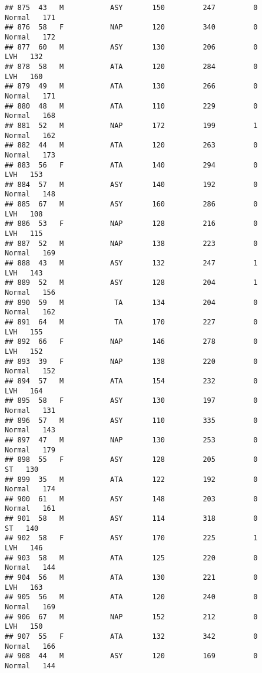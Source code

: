 \documentclass[
]{article}
\begin{document}
\begin{verbatim}
## 875  43   M           ASY       150         247         0     Normal   171
## 876  58   F           NAP       120         340         0     Normal   172
## 877  60   M           ASY       130         206         0        LVH   132
## 878  58   M           ATA       120         284         0        LVH   160
## 879  49   M           ATA       130         266         0     Normal   171
## 880  48   M           ATA       110         229         0     Normal   168
## 881  52   M           NAP       172         199         1     Normal   162
## 882  44   M           ATA       120         263         0     Normal   173
## 883  56   F           ATA       140         294         0        LVH   153
## 884  57   M           ASY       140         192         0     Normal   148
## 885  67   M           ASY       160         286         0        LVH   108
## 886  53   F           NAP       128         216         0        LVH   115
## 887  52   M           NAP       138         223         0     Normal   169
## 888  43   M           ASY       132         247         1        LVH   143
## 889  52   M           ASY       128         204         1     Normal   156
## 890  59   M            TA       134         204         0     Normal   162
## 891  64   M            TA       170         227         0        LVH   155
## 892  66   F           NAP       146         278         0        LVH   152
## 893  39   F           NAP       138         220         0     Normal   152
## 894  57   M           ATA       154         232         0        LVH   164
## 895  58   F           ASY       130         197         0     Normal   131
## 896  57   M           ASY       110         335         0     Normal   143
## 897  47   M           NAP       130         253         0     Normal   179
## 898  55   F           ASY       128         205         0         ST   130
## 899  35   M           ATA       122         192         0     Normal   174
## 900  61   M           ASY       148         203         0     Normal   161
## 901  58   M           ASY       114         318         0         ST   140
## 902  58   F           ASY       170         225         1        LVH   146
## 903  58   M           ATA       125         220         0     Normal   144
## 904  56   M           ATA       130         221         0        LVH   163
## 905  56   M           ATA       120         240         0     Normal   169
## 906  67   M           NAP       152         212         0        LVH   150
## 907  55   F           ATA       132         342         0     Normal   166
## 908  44   M           ASY       120         169         0     Normal   144

\end{verbatim}
\end{document}
